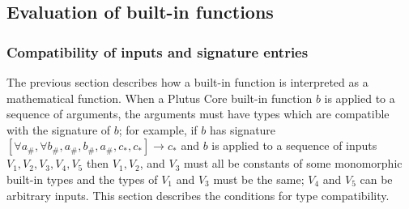 


\subsection{Evaluation of built-in functions}
\label{sec:builtin-evaluation}

\subsubsection{Compatibility of inputs and signature entries}
\label{sec:compatibility}
The previous section describes how a built-in function is interpreted as a
mathematical function.  When a Plutus Core built-in function $b$ is applied to a
sequence of arguments, the arguments must have types which are compatible with
the signature of $b$; for example, if $b$ has signature $[\forall a_\#, \forall
  b_\#, a_\#, b_\#, a_\#, c_*, c_*] \rightarrow c_*$ and $b$ is applied to a
sequence of inputs $V_1, V_2, V_3, V_4, V_5$ then $V_1, V_2$, and $V_3$ must all
be constants of some monomorphic built-in types and the types of $V_1$ and $V_3$
must be the same; $V_4$ and $V_5$ can be arbitrary inputs.  This section
describes the conditions for type compatibility.



